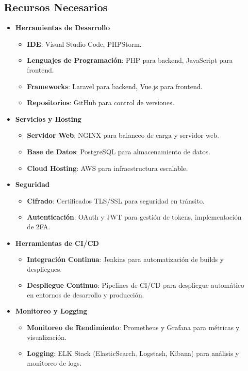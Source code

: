 \documentclass{article}
\begin{document}
\subsection{Recursos Necesarios}

\begin{itemize}
    \item \textbf{Herramientas de Desarrollo}
          \begin{itemize}
              \item \textbf{IDE}: Visual Studio Code, PHPStorm.
              \item \textbf{Lenguajes de Programación}: PHP para backend, JavaScript para frontend.
              \item \textbf{Frameworks}: Laravel para backend, Vue.js para frontend.
              \item \textbf{Repositorios}: GitHub para control de versiones.
          \end{itemize}

    \item \textbf{Servicios y Hosting}
          \begin{itemize}
              \item \textbf{Servidor Web}: NGINX para balanceo de carga y servidor web.
              \item \textbf{Base de Datos}: PostgreSQL para almacenamiento de datos.
              \item \textbf{Cloud Hosting}: AWS para infraestructura escalable.
          \end{itemize}

    \item \textbf{Seguridad}
          \begin{itemize}
              \item \textbf{Cifrado}: Certificados TLS/SSL para seguridad en tránsito.
              \item \textbf{Autenticación}: OAuth y JWT para gestión de tokens, implementación de 2FA.
          \end{itemize}

    \item \textbf{Herramientas de CI/CD}
          \begin{itemize}
              \item \textbf{Integración Continua}: Jenkins para automatización de builds y despliegues.
              \item \textbf{Despliegue Continuo}: Pipelines de CI/CD para despliegue automático en entornos de desarrollo y producción.
          \end{itemize}

    \item \textbf{Monitoreo y Logging}
          \begin{itemize}
              \item \textbf{Monitoreo de Rendimiento}: Prometheus y Grafana para métricas y visualización.
              \item \textbf{Logging}: ELK Stack (ElasticSearch, Logstash, Kibana) para análisis y monitoreo de logs.
          \end{itemize}
\end{itemize}
\end{document}
